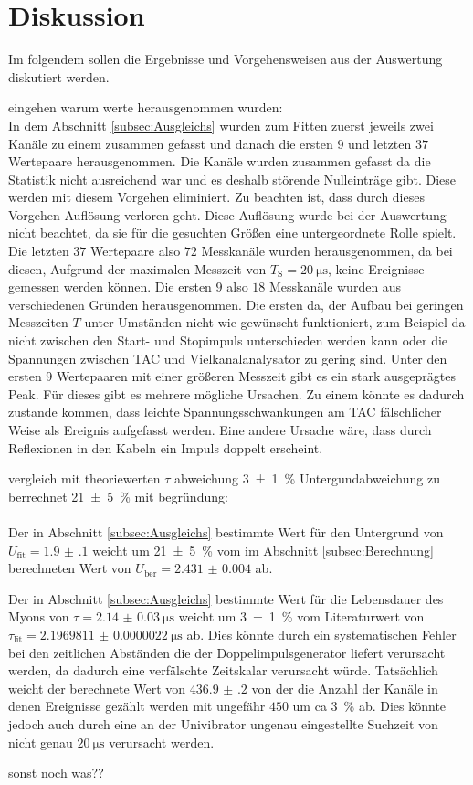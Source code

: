 
\section{Diskussion}
\label{sec:Diskussion}
Im folgendem sollen die Ergebnisse und Vorgehensweisen aus der Auswertung diskutiert werden.

eingehen warum werte herausgenommen wurden:\\
In dem Abschnitt \ref{subsec:Ausgleichs} wurden zum Fitten zuerst jeweils zwei Kanäle zu einem zusammen gefasst und danach die ersten $9$ und letzten $37$ Wertepaare herausgenommen.
Die Kanäle wurden zusammen gefasst da die Statistik nicht ausreichend war und es deshalb störende Nulleinträge gibt. Diese werden mit diesem Vorgehen eliminiert. Zu beachten ist, dass durch dieses Vorgehen Auflösung verloren geht. Diese Auflösung wurde bei der Auswertung nicht beachtet, da sie für die gesuchten Größen eine untergeordnete Rolle spielt. Die letzten $37$ Wertepaare also $72$ Messkanäle wurden herausgenommen, da bei diesen, Aufgrund der maximalen Messzeit von $T_\text{S}=\SI{20}{\micro\second}$, keine Ereignisse gemessen werden können. Die ersten $9$ also $18$ Messkanäle wurden aus verschiedenen Gründen herausgenommen. Die ersten da, der Aufbau bei geringen Messzeiten $T$ unter Umständen nicht wie gewünscht funktioniert, zum Beispiel da nicht zwischen den Start- und Stopimpuls unterschieden werden kann oder die Spannungen zwischen TAC und Vielkanalanalysator zu gering sind. Unter den ersten $9$ Wertepaaren mit einer größeren Messzeit gibt es ein stark ausgeprägtes Peak. Für dieses gibt es mehrere mögliche Ursachen. Zu einem könnte es dadurch zustande kommen, dass leichte Spannungsschwankungen am TAC fälschlicher Weise als Ereignis aufgefasst werden. Eine andere Ursache wäre, dass durch Reflexionen in den Kabeln ein Impuls doppelt erscheint.





vergleich mit theoriewerten $\tau$ abweichung \SI{3(1)}{\percent} Untergundabweichung zu berrechnet \SI{21(5)}{\percent}
mit begründung:\\\\
Der in Abschnitt \ref{subsec:Ausgleichs} bestimmte Wert für den Untergrund von $U_\text{fit}=\num{1.9(1)}$ weicht um \SI{21(5)}{\percent} vom im Abschnitt \ref{subsec:Berechnung} berechneten Wert von $U_\text{ber}=\num{2.431(4)}$ ab.


Der in Abschnitt \ref{subsec:Ausgleichs} bestimmte Wert für die Lebensdauer des Myons von $\tau=\SI{2.14(3)}{\micro\second}$ weicht um \SI{3(1)}{\percent} vom Literaturwert von $\tau_\text{lit}=\SI{2.1969811(22)}{\micro\second}$ \cite{ParticlePhysics} ab. Dies könnte durch ein systematischen Fehler bei den zeitlichen Abständen die der Doppelimpulsgenerator liefert verursacht werden, da dadurch eine verfälschte Zeitskalar verursacht würde. Tatsächlich weicht der berechnete Wert von $\num{436.9(2)}$ von der die Anzahl der Kanäle in denen Ereignisse gezählt werden mit ungefähr $450$ um ca \SI{3}{\percent} ab. Dies könnte jedoch auch durch eine an der Univibrator ungenau eingestellte Suchzeit von nicht genau $\SI{20}{\micro\second}$ verursacht werden.




sonst noch was??